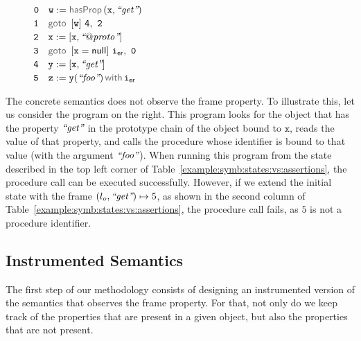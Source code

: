 \begin{figure}
\vspace*{-0.24cm}
{\small
\hspace*{-0.5cm} $\mathtt{0\quad w := \hasfield(x, \litstring{get})}$ \\
\hspace*{-0.5cm} $\mathtt{1\quad \ifgoto{w}{4}{2}}$ \\
\hspace*{-0.5cm} $\mathtt{2\quad x := [x, \text{{\it ``\ensuremath{\mathit{@proto}}''}}] }$ \\ 
\hspace*{-0.5cm} $\mathtt{3\quad \ifgoto{x = \jnull}{\errlab}{0}}$ \\
\hspace*{-0.5cm} $\mathtt{4\quad y := [x, \text{{\it ``get''}}]}$ \\
\hspace*{-0.5cm} $\mathtt{5\quad \jsilcall{z}{y}{\litstring{foo}}{\errlab}}$ 
}
\vspace*{-0.2cm}
\end{figure}




The \jsil concrete semantics does not observe the frame property. To illustrate this,
let us consider the program on the right. 
This program looks for the object that has the property $\text{{\it ``get''}}$ in the 
prototype chain of the object bound to $\mathtt{x}$, reads the value of that 
property, and calls the procedure whose identifier is bound to that value 
(with the argument $\text{{\it ``foo''}}$). 
When running this program from the state described in the top left corner of 
Table~\ref{example:symb:states:vs:assertions}, the procedure call can be executed 
successfully. However, if we extend the initial state with the frame $(l_o, \text{{\it ``get''}}) \mapsto 5$, 
as shown in the second column of Table~\ref{example:symb:states:vs:assertions}, the procedure 
call fails, as $5$ is not a procedure identifier. 


\subsection{Instrumented Semantics}\label{subsec:instrumented}

The first step of our methodology %
consists of designing an instrumented version of the semantics that observes the frame property. 
%
For that, not only do we keep track of the properties that are present in a given object, but also the properties that 
are not present.

